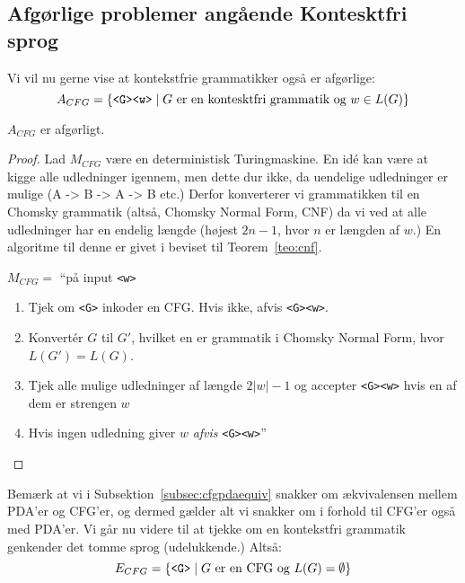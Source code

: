 \subsection{Afgørlige problemer angående Kontesktfri sprog}%
\label{subsec:afgørlighedkontekstfri}



Vi vil nu gerne vise at kontekstfrie grammatikker også er afgørlige:
\begin{equation*}
	A_{CFG} = \{\text{\texttt{<G><w>}} \mid G \text{ er en kontesktfri grammatik og }w \in L(G)\}
\end{equation*}

\begin{theorem}
	$A_{CFG}$ er afgørligt.
\end{theorem}

\begin{proof}
	Lad $M_{CFG}$ være en deterministisk Turingmaskine. En idé kan være at kigge alle udledninger igennem, men dette dur ikke, da uendelige udledninger er mulige (A -> B -> A -> B etc.) Derfor konverterer vi grammatikken til en Chomsky grammatik (altså, Chomsky Normal Form, CNF) da vi ved at alle udledninger har en endelig længde (højest $2n-1$, hvor $n$ er længden af $w$.) En algoritme til denne er givet i beviset til Teorem~\ref{teo:cnf}.

	$M_{CFG} = $ ``på input \texttt{<w>}
	\begin{enumerate}
		\item Tjek om \texttt{<G>} inkoder en CFG. Hvis ikke, afvis \texttt{<G><w>}.
		\item Konvertér $G$ til $G'$, hvilket en er grammatik i Chomsky Normal Form, hvor $L(G') = L(G)$.
		\item Tjek alle mulige udledninger af længde $2|w| -1$ og accepter \texttt{<G><w>} hvis en af dem er strengen $w$
		\item Hvis ingen udledning giver $w$ \textit{afvis} \texttt{<G><w>}''
	\end{enumerate}
\end{proof}

Bemærk at vi i Subsektion~\ref{subsec:cfgpdaequiv} snakker om ækvivalensen mellem PDA'er og CFG'er, og dermed gælder alt vi snakker om i forhold til CFG'er også med PDA'er.
Vi går nu videre til at tjekke om en kontekstfri grammatik genkender det tomme sprog (udelukkende.) Altså:
\begin{equation*}
	E_{CFG} = \{\text{\texttt{<G>}} \mid G \text{ er en CFG og }L(G) = \emptyset\}
\end{equation*}

